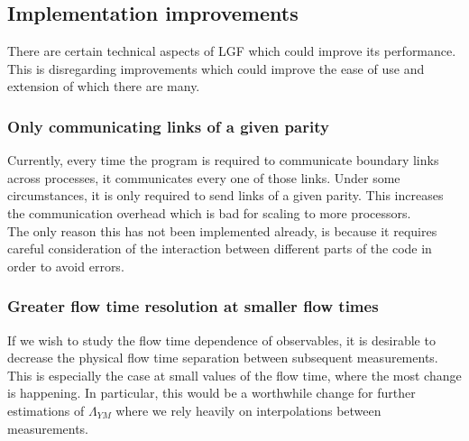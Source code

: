\documentclass[a4paper,10pt]{book}
\begin{document}
\subsection{Implementation improvements}
There are certain technical aspects of LGF which could improve its performance. This is disregarding improvements which could improve the ease of use and extension of which there are many.
\subsubsection{Only communicating links of a given parity}
Currently, every time the program is required to communicate boundary links across processes, it communicates every one of those links. Under some circumstances, it is only required to send links of a given parity. This increases the communication overhead which is bad for scaling to more processors.\\The only reason this has not been implemented already, is because it requires careful consideration of the interaction between different parts of the code in order to avoid errors.
\subsubsection{Greater flow time resolution at smaller flow times}
If we wish to study the flow time dependence of observables, it is desirable to decrease the physical flow time separation between subsequent measurements. This is especially the case at small values of the flow time, where the most change is happening. In particular, this would be a worthwhile change for further estimations of $\Lambda_{YM}$ where we rely heavily on interpolations between measurements.
\newpage


\end{document}
